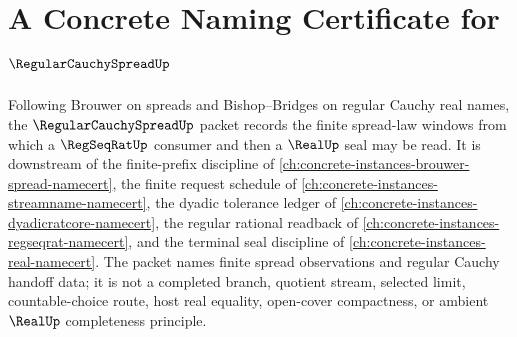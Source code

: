 \chapter{A Concrete Naming Certificate for $\RegularCauchySpreadUp$}
\label{ch:concrete-instances-regular-cauchy-spread-namecert}

Following Brouwer on spreads and Bishop--Bridges on regular Cauchy real names, the $\RegularCauchySpreadUp$ packet records the finite spread-law windows from which a $\RegSeqRatUp$ consumer and then a $\RealUp$ seal may be read. It is downstream of the finite-prefix discipline of \autoref{ch:concrete-instances-brouwer-spread-namecert}, the finite request schedule of \autoref{ch:concrete-instances-streamname-namecert}, the dyadic tolerance ledger of \autoref{ch:concrete-instances-dyadicratcore-namecert}, the regular rational readback of \autoref{ch:concrete-instances-regseqrat-namecert}, and the terminal seal discipline of \autoref{ch:concrete-instances-real-namecert}. The packet names finite spread observations and regular Cauchy handoff data; it is not a completed branch, quotient stream, selected limit, countable-choice route, host real equality, open-cover compactness, or ambient $\RealUp$ completeness principle.

